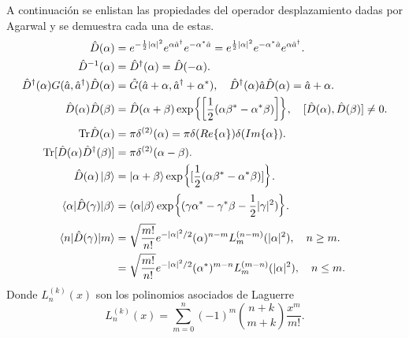 A continuación se enlistan las propiedades del operador desplazamiento dadas por Agarwal \cite{Agarwal_2012} y se demuestra cada una de estas.
\begin{align}
  \hat{D}(\alpha)                                                     & = e^{-\frac{1}{2}|\alpha|^2} e^{\alpha \hat{a}^\dagger} e^{-\alpha^* \hat{a}}  = e^{\frac{1}{2}|\alpha|^2} e^{-\alpha^* \hat{a}} e^{\alpha \hat{a}^\dagger}. \label{eq:disp-prop-1} \\
  \hat{D}^{-1}(\alpha)                                                & = \hat{D}^\dagger (\alpha) = \hat{D}(-\alpha).                                                                                                               \label{eq:disp-prop-2} \\
  \hat{D}^\dagger(\alpha) G(\hat{a}, \hat{a}^\dagger) \hat{D}(\alpha) & = \hat{G}(\hat{a} + \alpha, \hat{a}^\dagger + \alpha^*), \quad \hat{D}^\dagger(\alpha)\hat{a}\hat{D}(\alpha) = \hat{a}+\alpha.                               \label{eq:disp-prop-3} \\
  \hat{D}(\alpha)\hat{D}(\beta)                                       & = \hat{D}(\alpha + \beta) \exp{\left[ \frac{1}{2}(\alpha\beta^* - \alpha^*\beta) \right]}, \quad [\hat{D}(\alpha), \hat{D}(\beta)]\neq 0.                    \label{eq:disp-prop-4} \\
  \mathrm{Tr}\hat{D}(\alpha)                                          & = \pi \delta^{(2)}(\alpha) = \pi\delta(Re\{\alpha\})\delta(Im\{\alpha\}).                                                                                    \label{eq:disp-prop-5} \\
  \mathrm{Tr}[\hat{D}(\alpha)\hat{D}^\dagger(\beta)]                  & = \pi \delta^{(2)}(\alpha-\beta).                                                                                                                            \label{eq:disp-prop-6} \\
  \hat{D}(\alpha)\ket{\beta}                                          & = \ket{\alpha + \beta} \exp{[\frac{1}{2}(\alpha\beta^* - \alpha^*\beta)]}.                                                                                   \label{eq:disp-prop-7} \\
  \langle \alpha \vert \hat{D}(\gamma) \vert \beta\rangle             & = \braket{\alpha}{\beta}\exp{(\gamma\alpha^* - \gamma^*\beta - \frac{1}{2}|\gamma|^2)}.                                                                      \label{eq:disp-prop-8} \\
  \langle n \vert \hat{D}(\gamma) \vert m \rangle                     & = \sqrt{\frac{m!}{n!}}e^{-|\alpha|^2/2}(\alpha)^{n-m}L_m^{(n-m)}(|\alpha|^2),\quad n\geq m.                                                                  \label{eq:disp-prop-9} \\
                                                                      & = \sqrt{\frac{m!}{n!}}e^{-|\alpha|^2/2}(\alpha^*)^{m-n}L_m^{(m-n)}(|\alpha|^2), \quad n\leq m. \label{eq:disp-prop-10}
\end{align}
Donde $L_n^{(k)}(x)$ son los polinomios asociados de Laguerre
\begin{equation} \label{eq:laguerre}
  L_n^{(k)}(x) = \sum_{m=0}^{n} (-1)^m\binom{n+k}{m+k}\frac{x^m}{m!}.
\end{equation}

